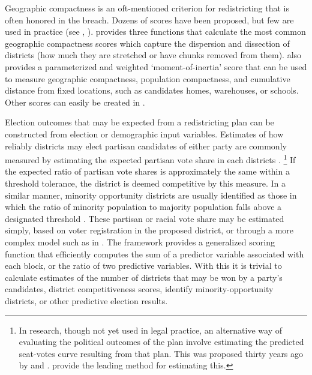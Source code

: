 \documentclass[article]{JSSstyle/jss}
\begin{document}
Geographic compactness is an oft-mentioned criterion for redistricting 
that is often honored in the breach.  Dozens of scores have been proposed, but 
few are used in practice (see \citet{Altman98}, \citet{Niemi91}).  provides three functions that calculate the most common geographic compactness scores which capture the dispersion and dissection of districts (how much they are stretched or have chunks removed from them).  also provides a parameterized and weighted `moment-of-inertia' score that can be used to measure geographic compactness, population compactness, and cumulative distance from fixed locations, such as candidates homes, warehouses, or schools. Other scores can easily be created in .

Election outcomes that may be expected from a redistricting plan can be constructed from election or demographic input variables. Estimates of how reliably 
districts may elect partisan candidates of either party are commonly measured by estimating the expected partisan vote share in each districts \citep{McDonald06a}.
\footnote{In research, though not yet used in legal practice, an alternative way of evaluating the political outcomes of the plan involve estimating the predicted seat-votes curve resulting from that plan. This was proposed thirty years ago 
by \citet{Tufte73} and \citet{NieDee78}. \citet{GelKing94} provide the leading method for estimating this.} 
If the expected ratio of partisan vote shares is approximately the same within a threshold tolerance, the district is deemed competitive by this measure. 
In a similar manner, minority opportunity districts are usually identified as those in which the ratio of minority 
population to majority population falls above a designated threshold \citep{GrofHand92}.
These partisan or racial vote share may be estimated simply, based on voter registration in the proposed 
district, or through a more complex model such as in \citet{GelKing94}.  The  
framework provides a generalized scoring function that efficiently computes the sum of a predictor variable 
associated with each block, or the ratio of two predictive variables. With this it is 
trivial to calculate estimates of the number of districts that may be won by a party's candidates, district competitiveness scores, 
identify minority-opportunity districts, or other predictive election results.  
\end{document}

